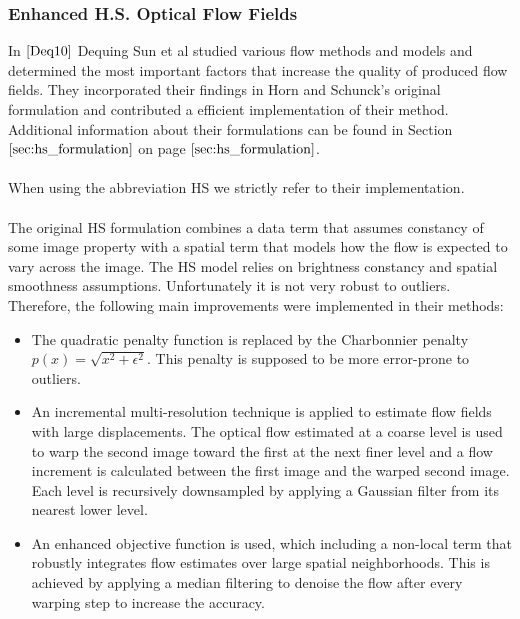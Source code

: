 \subsubsection{Enhanced H.S. Optical Flow Fields}
In $\cite{Deq10}$ Dequing Sun et al studied various flow methods and models and determined the most important factors that increase the quality of produced flow fields. They incorporated their findings in Horn and Schunck's original formulation and contributed a efficient implementation of their method. Additional information about their formulations can be found in Section $\ref{sec:hs_formulation}$ on page $\pageref{sec:hs_formulation}$. \\ \\
When using the abbreviation HS we strictly refer to their implementation. \\ \\
The original HS formulation combines a data term that assumes constancy of some image property with a spatial term that models how the flow is expected to vary across the image. The HS model relies on brightness constancy and spatial smoothness assumptions. Unfortunately it is not very robust to outliers. Therefore, the following main improvements were implemented in their methods:
\begin{itemize}
  \item The quadratic penalty function is replaced by the Charbonnier penalty $p\left( x \right) = \sqrt{x^2 + \epsilon^2}$. This penalty is supposed to be more error-prone to outliers.
  \item An incremental multi-resolution technique is applied to estimate flow fields with large displacements. The optical flow estimated at a coarse level is used to warp the second image toward the first at the next finer level and a flow increment is calculated between the first image and the warped second image. Each level is recursively downsampled by applying a Gaussian filter from its nearest lower level.
  \item An enhanced objective function is used, which including a non-local term that robustly integrates flow estimates over large spatial neighborhoods. This is achieved by applying a median filtering to denoise the flow after every warping step to increase the accuracy.
\end{itemize}

